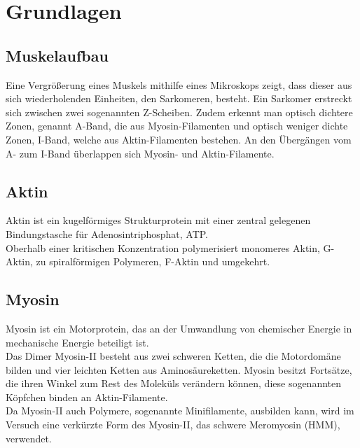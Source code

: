 
\section{Grundlagen}
\subsection{Muskelaufbau}
Eine Vergrößerung eines Muskels mithilfe eines Mikroskops zeigt, dass dieser aus sich wiederholenden Einheiten, den Sarkomeren, besteht. Ein Sarkomer erstreckt sich zwischen zwei sogenannten Z-Scheiben. Zudem erkennt man optisch dichtere Zonen, genannt A-Band, die aus Myosin-Filamenten und optisch weniger dichte Zonen, I-Band, welche aus Aktin-Filamenten bestehen. An den Übergängen vom A- zum I-Band überlappen sich Myosin- und Aktin-Filamente.
\subsection{Aktin}
Aktin ist ein kugelförmiges Strukturprotein mit einer zentral gelegenen Bindungstasche für Adenosintriphosphat, ATP.\\
Oberhalb einer kritischen Konzentration polymerisiert monomeres Aktin, G-Aktin, zu spiralförmigen Polymeren, F-Aktin und umgekehrt.
\subsection{Myosin}
Myosin ist ein Motorprotein, das an der Umwandlung von chemischer Energie in mechanische Energie beteiligt ist.\\
Das Dimer Myosin-II besteht aus zwei schweren Ketten, die die Motordomäne bilden und vier leichten Ketten aus Aminosäureketten. Myosin besitzt Fortsätze, die ihren Winkel zum Rest des Moleküls verändern können, diese sogenannten Köpfchen binden an Aktin-Filamente.\\
Da Myosin-II auch Polymere, sogenannte Minifilamente, ausbilden kann, wird im Versuch eine verkürzte Form des Myosin-II, das schwere Meromyosin (HMM), verwendet.
